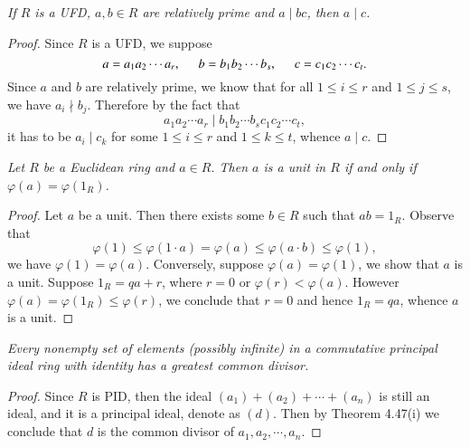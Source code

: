 \begin{problem}\em
If $R$ is a UFD, $a,b\in R$ are relatively prime and $a\mid bc$, then $a\mid c$.
\end{problem}
\begin{proof}
Since $R$ is a UFD, we suppose 
$$
a=a_1a_2\cdots a_r,\hspace{0.5cm}b=b_1b_2\cdots b_s,\hspace{0.5cm}c=c_1c_2\cdots c_t.
$$
Since $a$ and $b$ are relatively prime, we know that for all $1\le i\le r$ and $1\le j\le s$, we have $a_i\nmid b_j$. Therefore by the fact that 
$$
a_1a_2\cdots a_r\mid b_1b_2\cdots b_sc_1c_2\cdots c_t,
$$
it has to be $a_i\mid c_k$ for some $1\le i\le r$ and $1\le k\le t$, whence $a\mid c$.
\end{proof}
\begin{problem}\em
Let $R$ be a Euclidean ring and $a\in R$. Then $a$ is a unit in $R$ if and only if $\varphi(a)=\varphi(1_R)$.
\end{problem}
\begin{proof}
Let $a$ be a unit. Then there exists some $b\in R$ such that $ab=1_R$. Observe that 
$$
\varphi \left( 1 \right) \le \varphi \left( 1\cdot a \right) =\varphi \left( a \right) \le \varphi \left( a\cdot b \right) \le \varphi \left( 1 \right) ,
$$
we have $\varphi(1)=\varphi(a)$. Conversely, suppose $\varphi(a)=\varphi(1)$, we show that $a$ is a unit. Suppose $1_R=qa+r$, where $r=0$ or $\varphi(r)<\varphi(a)$. However $\varphi(a)=\varphi(1_R)\le\varphi(r)$, we conclude that $r=0$ and hence $1_R=qa$, whence $a$ is a unit.
\end{proof}
\begin{problem}\em
Every nonempty set of elements (possibly infinite) in a commutative principal ideal ring with identity has a greatest common divisor.
\end{problem}
\begin{proof}
Since $R$ is PID, then the ideal $(a_1)+(a_2)+\cdots+(a_n)$ is still an ideal, and it is a principal ideal, denote as $(d)$. Then by Theorem 4.47(i) we conclude that $d$ is the common divisor of $a_1,a_2,\cdots,a_n$.
\end{proof}
